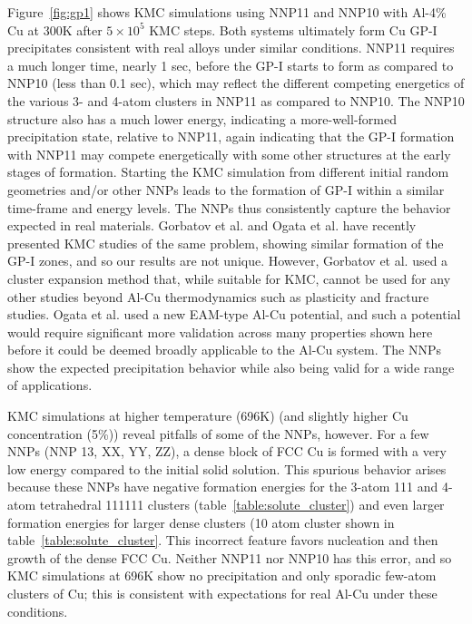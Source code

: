 \documentclass{article}
\begin{document}
Figure~\ref{fig:gp1} shows KMC simulations using NNP11 and NNP10 with Al-4\% Cu at 300K after $5\times10^{5}$ KMC steps.  Both systems ultimately form Cu GP-I precipitates consistent with real alloys under similar conditions. NNP11 requires a much longer time, nearly 1 sec, before the GP-I starts to form as compared to NNP10 (less than 0.1 sec), which may reflect the different competing energetics of the various 3- and 4-atom clusters in NNP11 as compared to NNP10. The NNP10 structure also has a much lower energy, indicating a more-well-formed precipitation state, relative to NNP11, again indicating that the GP-I formation with NNP11 may compete energetically with some other structures at the early stages of formation. Starting the KMC simulation from different initial random geometries and/or other NNPs leads to the formation of GP-I within a similar time-frame and energy levels. The NNPs thus consistently capture the behavior expected in real materials.  Gorbatov et al. and Ogata et al. have recently presented KMC studies of the same problem, showing similar formation of the GP-I zones, and so our results are not unique.  However, Gorbatov et al. used a cluster expansion method that, while suitable for KMC, cannot be used for any other studies beyond Al-Cu thermodynamics such as plasticity and fracture studies.  Ogata et al. used a new EAM-type Al-Cu potential, and such a potential would require significant more validation across many properties shown here before it could be deemed broadly applicable to the Al-Cu system.  The NNPs show the expected precipitation behavior while also being valid for a wide range of applications.

KMC simulations at higher temperature (696K) (and slightly higher Cu concentration (5\%)) reveal pitfalls of some of the NNPs, however.  For a few NNPs (NNP 13, XX, YY, ZZ), a dense block of FCC Cu is formed with a very low energy compared to the initial solid solution.  This spurious behavior arises because these NNPs have negative formation energies for the 3-atom 111 and 4-atom tetrahedral 111111 clusters (table~\ref{table:solute_cluster}) and even larger formation energies for larger dense clusters (10 atom cluster shown in table~\ref{table:solute_cluster}.  This incorrect feature favors nucleation and then growth of the dense FCC Cu.  Neither NNP11 nor NNP10 has this error, and so KMC simulations at 696K show no precipitation and only sporadic few-atom clusters of Cu; this is consistent with expectations for real Al-Cu under these conditions.  
\end{document}
